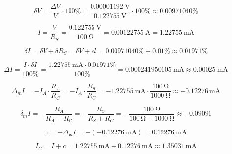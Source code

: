 \begin{equation}
	\delta V = \frac{\Delta V}{V}\cdot 100\unit{\percent} = \frac{\SI{0.00001192}{\volt}}{\SI{0.122755}{\volt}}\cdot 100\unit{\percent} \approx 0.00971040 \unit{\percent}
\end{equation}

\begin{equation}
	I = \frac{V}{R_S} = \frac{\SI{0.122755}{\volt}}{\SI{100}{\ohm}} = \SI{0.00122755}{\ampere} = \SI{1.22755}{\milli\ampere}
\end{equation}

\begin{equation}
	\delta I = \delta V + \delta R_S = \delta V + cl =  0.00971040\unit{\percent} + 0.01\unit{\percent} \approx 0.01971\unit{\percent}
\end{equation}

\begin{equation}
	\Delta I = \frac{I\cdot\delta I}{100\unit{\percent}} = \frac{ \SI{1.22755}{\milli\ampere}\cdot  0.01971\unit{\percent}}{100\unit{\percent}} = \SI{0.000241950105}{\milli\ampere}\approx\SI{ 0.00025}{\milli\ampere}
\end{equation}

\begin{equation}
	\Delta_m I = -I_A \cdot\frac{R_A}{R_C} = -I_A \cdot\frac{R_S}{R_C} = - \SI{1.22755}{\milli\ampere}\cdot\frac{\SI{100}{\ohm}}{\SI{1000}{\ohm}} \approx -\SI{0.12276}{\milli\ampere}
\end{equation}

\begin{equation}
	\delta_m I = -\frac{R_A}{R_A + R_C} = -\frac{R_S}{R_S + R_C} = -\frac{\SI{100}{\ohm}}{\SI{100}{\ohm} + \SI{1000}{\ohm}} \approx -0.09091
\end{equation}

\begin{equation}
	c = -\Delta_m I = -(-\SI{0.12276}{\milli\ampere}) =  \SI{0.12276}{\milli\ampere}
\end{equation}

\begin{equation}
	I_C = I + c = \SI{1.22755}{\milli\ampere} +\SI{0.12276}{\milli\ampere} \approx \SI{1.35031}{\milli\ampere}
\end{equation}





